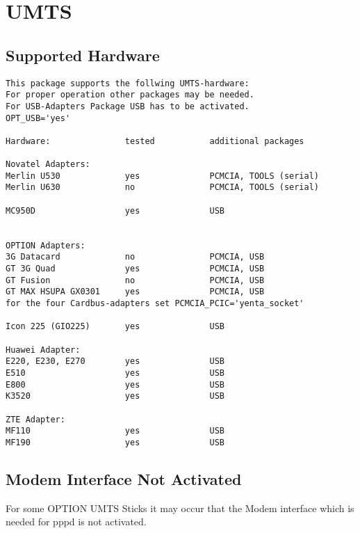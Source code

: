 \section {UMTS}

\subsection{Supported Hardware}

\begin{verbatim}
This package supports the follwing UMTS-hardware:
For proper operation other packages may be needed.
For USB-Adapters Package USB has to be activated.
OPT_USB='yes'

Hardware:               tested           additional packages

Novatel Adapters:
Merlin U530             yes              PCMCIA, TOOLS (serial)
Merlin U630             no               PCMCIA, TOOLS (serial)

MC950D                  yes              USB


OPTION Adapters:
3G Datacard             no               PCMCIA, USB
GT 3G Quad              yes              PCMCIA, USB
GT Fusion               no               PCMCIA, USB
GT MAX HSUPA GX0301     yes              PCMCIA, USB
for the four Cardbus-adapters set PCMCIA_PCIC='yenta_socket'

Icon 225 (GIO225)       yes              USB

Huawei Adapter:
E220, E230, E270        yes              USB
E510                    yes              USB
E800                    yes              USB
K3520                   yes              USB

ZTE Adapter:
MF110                   yes              USB
MF190                   yes              USB
\end{verbatim}


\subsection{Modem Interface Not Activated}

For some OPTION UMTS Sticks it may occur that the Modem interface
which is needed for pppd is not activated.

